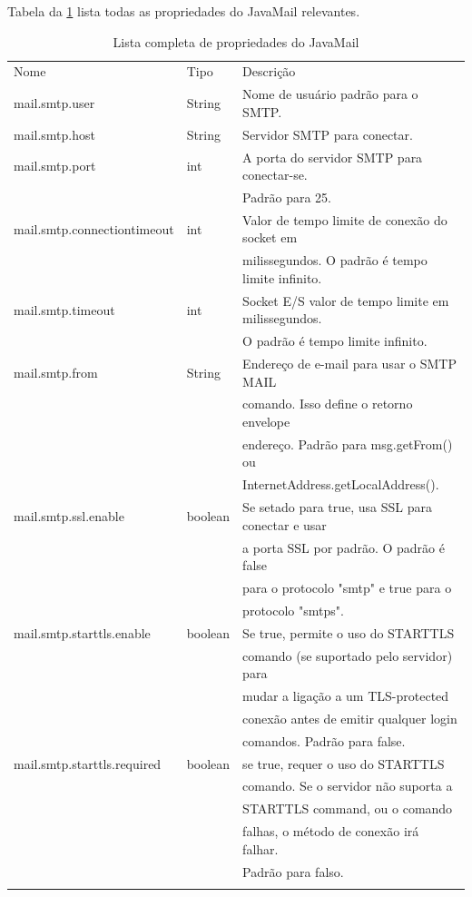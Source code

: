 \documentclass[envcountsame,envcountchap]{svmono}
\begin{document}
Tabela da \ref{tab:javamail-properties} lista todas as propriedades do JavaMail relevantes.

\begin{table}
\centering
\caption{Lista completa de propriedades do JavaMail}
\label{tab:javamail-properties}
\begin{tabular}{lll}
\hline\noalign{\smallskip}
Nome & Tipo & Descrição  \\
\noalign{\smallskip}\hline\noalign{\smallskip}
mail.smtp.user & String & Nome de usuário padrão para o SMTP. \\
mail.smtp.host & String & Servidor SMTP para conectar. \\
mail.smtp.port & int & A porta do servidor SMTP para conectar-se.\\ & & Padrão para 25. \\
mail.smtp.connectiontimeout & int & Valor de tempo limite de conexão do socket em \\ & & milissegundos. O padrão é tempo limite infinito.\\
mail.smtp.timeout & int & Socket E/S valor de tempo limite em milissegundos. \\ & & O padrão é tempo limite infinito. \\
mail.smtp.from & String & Endereço de e-mail para usar o SMTP MAIL \\ & & comando. Isso define o retorno envelope \\ & & endereço. Padrão para msg.getFrom() ou \\ & & InternetAddress.getLocalAddress(). \\
mail.smtp.ssl.enable & boolean & Se setado para true, usa SSL para conectar e usar \\ & & a porta SSL por padrão. O padrão é false \\ & & para o protocolo "smtp" e true para o \\ & & protocolo "smtps". \\
mail.smtp.starttls.enable & boolean & Se true, permite o uso do STARTTLS\\ & & comando (se suportado pelo servidor) para\\ & & mudar a ligação a um TLS-protected\\ & & conexão antes de emitir qualquer login\\ & & comandos. Padrão para false. \\
mail.smtp.starttls.required & boolean & se true, requer o uso do STARTTLS \\ & & comando. Se o servidor não suporta a \\ & & STARTTLS command, ou o comando \\ & & falhas, o método de conexão irá falhar. \\ & &Padrão para falso. \\
\noalign{\smallskip}\hline
\end{tabular}
\end{table}

\backmatter

\printindex
\end{document}
